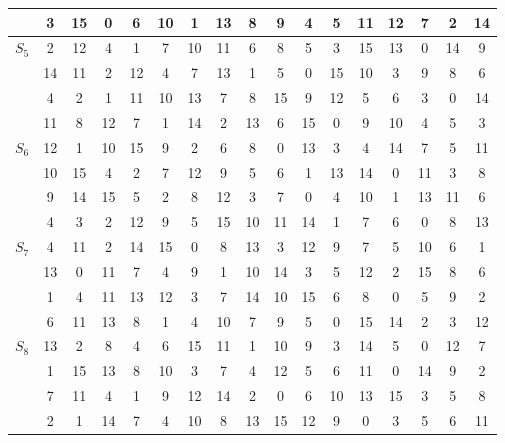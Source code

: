 \documentclass[11pt,a4paper]{article}
\begin{document}
\begin{enumerate}
\begin{itemize}
\begin{itemize}
\begin{table}[!ht]
\begin{tabular}{c|cccccccccccccccc}
						& 3 & 15 & 0 & 6 & 10 & 1 & 13 & 8 & 9 & 4 & 5 & 11 & 12 & 7 & 2 & 14 \\\hline                                                                     
						\multirow{4}{*}{$S_5$} & 2 & 12 & 4 & 1 & 7 & 10 & 11 & 6 & 8 & 5 & 3 & 15 & 13 & 0 & 14 & 9 \\  
						& 14 & 11 & 2 & 12 & 4 & 7 & 13 & 1 & 5 & 0 & 15 & 10 & 3 & 9 & 8 & 6 \\  
						& 4 & 2 & 1 & 11 & 10 & 13 & 7 & 8 & 15 & 9 & 12 & 5 & 6 & 3 & 0 & 14 \\  
						& 11 & 8 & 12 & 7 & 1 & 14 & 2 & 13 & 6 & 15 & 0 & 9 & 10 & 4 & 5 & 3 \\\hline                                                                     
						\multirow{4}{*}{$S_6$} & 12 & 1 & 10 & 15 & 9 & 2 & 6 & 8 & 0 & 13 & 3 & 4 & 14 & 7 & 5 & 11 \\  
						& 10 & 15 & 4 & 2 & 7 & 12 & 9 & 5 & 6 & 1 & 13 & 14 & 0 & 11 & 3 & 8 \\  
						& 9 & 14 & 15 & 5 & 2 & 8 & 12 & 3 & 7 & 0 & 4 & 10 & 1 & 13 & 11 & 6 \\  
						& 4 & 3 & 2 & 12 & 9 & 5 & 15 & 10 & 11 & 14 & 1 & 7 & 6 & 0 & 8 & 13 \\\hline                                                                     
						\multirow{4}{*}{$S_7$} & 4 & 11 & 2 & 14 & 15 & 0 & 8 & 13 & 3 & 12 & 9 & 7 & 5 & 10 & 6 & 1 \\  
						& 13 & 0 & 11 & 7 & 4 & 9 & 1 & 10 & 14 & 3 & 5 & 12 & 2 & 15 & 8 & 6 \\  
						& 1 & 4 & 11 & 13 & 12 & 3 & 7 & 14 & 10 & 15 & 6 & 8 & 0 & 5 & 9 & 2 \\  
						& 6 & 11 & 13 & 8 & 1 & 4 & 10 & 7 & 9 & 5 & 0 & 15 & 14 & 2 & 3 & 12 \\\hline                                                                     
						\multirow{4}{*}{$S_8$} & 13 & 2 & 8 & 4 & 6 & 15 & 11 & 1 & 10 & 9 & 3 & 14 & 5 & 0 & 12 & 7 \\  
						& 1 & 15 & 13 & 8 & 10 & 3 & 7 & 4 & 12 & 5 & 6 & 11 & 0 & 14 & 9 & 2 \\  
						& 7 & 11 & 4 & 1 & 9 & 12 & 14 & 2 & 0 & 6 & 10 & 13 & 15 & 3 & 5 & 8 \\  
						& 2 & 1 & 14 & 7 & 4 & 10 & 8 & 13 & 15 & 12 & 9 & 0 & 3 & 5 & 6 & 11 \\  
					\end{tabular}
			\end{table}
			

\end{itemize}
\end{itemize}
\end{enumerate}
\end{document}
